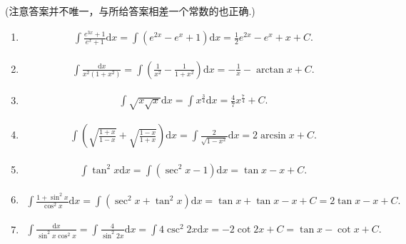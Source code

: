 \begin{solution}(注意答案并不唯一，与所给答案相差一个常数的也正确.)\\
    \begin{enumerate}
    \item[1.]
    \[
    \begin{aligned}
    \int \frac{e^{3x}+1}{e^x+1}\mathrm{d}x=\int(e^{2x}-e^x+1)\mathrm{d}x=\frac{1}{2}e^{2x}-e^x+x+C.
    \end{aligned}
    \]

    \item[2.]
    \[
    \begin{aligned}
    \int \frac{\mathrm{d}x}{x^2(1+x^2)}=\int \left(\frac{1}{x^2}-\frac{1}{1+x^2}\right)\mathrm{d}x=-\frac{1}{x}-\arctan{x}+C.
    \end{aligned}
    \]

    \item[3.]
    \[
    \begin{aligned}
    \int \sqrt{x\sqrt{x}}\mathrm{d}x=\int x^{\frac{3}{4}}\mathrm{d}x=\frac{4}{7}x^{\frac{7}{4}}+C.
    \end{aligned}
    \]

    \item[4.]
    \[
    \begin{aligned}
    \int \left(\sqrt{\frac{1+x}{1-x}}+\sqrt{\frac{1-x}{1+x}}\right)\mathrm{d}x=\int \frac{2}{\sqrt{1-x^2}}\mathrm{d}x=2\arcsin{x}+C.
    \end{aligned}
    \]

    \item[5.]
    \[
    \begin{aligned}
    \int \tan^2{x}\mathrm{d}x=\int\left(\sec^2{x}-1\right)\mathrm{d}x=\tan{x}-x+C.
    \end{aligned}
    \]

    \item[6.]
    \[
    \begin{aligned}
    \int\frac{1+\sin^2{x}}{\cos^2{x}}\mathrm{d}x=\int\left(\sec^2{x}+\tan^2{x}\right)\mathrm{d}x=\tan{x}+\tan{x}-x+C=2\tan{x}-x+C.
    \end{aligned}
    \]

    \item[7.]
    \[
    \begin{aligned}
    \int\frac{\mathrm{d}x}{\sin^2{x}\cos^2{x}}=\int\frac{4}{\sin^2{2x}}\mathrm{d}x=\int 4\csc^2{2x}\mathrm{d}x=-2\cot{2x}+C=\tan{x}-\cot{x}+C.
    \end{aligned}
    \]


\end{enumerate}
\end{solution}

